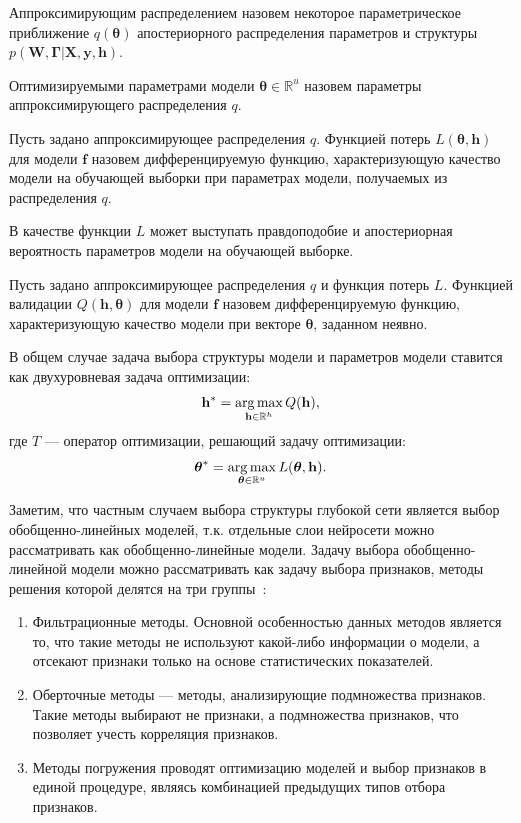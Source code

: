 \begin{defin}
Аппроксимирующим распределением назовем некоторое параметрическое приближение $q(\boldsymbol{\theta})$ апостериорного распределения параметров и структуры $p(\mathbf{W}, \boldsymbol{\Gamma}|\mathbf{X}, \mathbf{y}, \mathbf{h}).$ 
\end{defin}

\begin{defin}
Оптимизируемыми параметрами модели $\boldsymbol{\theta} \in \mathbb{R}^u$ назовем параметры аппроксимирующего распределения $q$.
\end{defin}

\begin{defin}
Пусть задано аппроксимирующее распределения $q$.
Функцией потерь $L(\boldsymbol{\theta}, \mathbf{h})$ для модели $\mathbf{f}$ назовем дифференцируемую функцию, характеризующую качество модели на обучающей выборки при параметрах модели, получаемых из  распределения $q$.
\end{defin}

В качестве функции $L$ может выступать правдоподобие и апостериорная вероятность параметров модели на обучающей выборке.

\begin{defin}
Пусть задано аппроксимирующее распределения $q$ и функция потерь $L$. 
Функцией валидации $Q(\mathbf{h},\boldsymbol{\theta})$ для модели $\mathbf{f}$ назовем дифференцируемую функцию, характеризующую качество модели при векторе $\boldsymbol{\theta}$, заданном неявно.
\end{defin}


В общем случае задача выбора структуры модели и параметров модели ставится как двухуровневая задача оптимизации:
\begin{equation}
\label{eq:optim}
	\mathbf{h}^{*} = \operatorname*{arg\,max}_{\mathbf{h} \in \mathbb{R}^h} Q(\mathbf{h}),
\end{equation}
где $T$ --- оператор оптимизации, решающий задачу оптимизации:
\[
   \boldsymbol{\theta}^{*} = \operatorname*{arg\,max}_{\boldsymbol{\theta} \in \mathbb{R}^u} L(\boldsymbol{\theta}, \mathbf{h}).
\]


Заметим, что частным случаем выбора структуры глубокой сети является выбор обобщенно-линейных моделей, т.к. отдельные слои нейросети можно рассматривать как обобщенно-линейные модели. Задачу выбора обобщенно-линейной модели можно рассматривать как задачу выбора признаков, методы решения которой делятся на три группы~\cite{feature_select}:
\begin{enumerate}
\item Фильтрационные методы. Основной особенностью данных методов является то, что такие методы не используют какой-либо информации о модели, а отсекают признаки только на основе статистических показателей. 
\item Оберточные методы --- методы, анализирующие подмножества признаков. Такие методы выбирают не признаки, а подмножества признаков, что позволяет учесть корреляция признаков.
\item Методы погружения проводят оптимизацию моделей и выбор признаков в единой процедуре, являясь комбинацией предыдущих типов отбора признаков.
\end{enumerate} 


